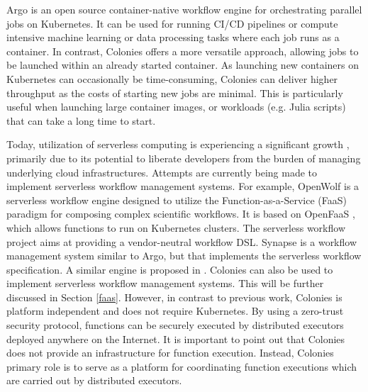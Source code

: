 \documentclass{article}
\begin{document}
Argo \cite{argowf} is an open source container-native workflow engine for orchestrating parallel jobs on Kubernetes. It can be used for running CI/CD pipelines or compute intensive machine learning or data processing tasks where each job runs as a container. In contrast, Colonies offers a more versatile approach, allowing jobs to be launched within an already started container. As launching new containers on Kubernetes can occasionally be time-consuming, Colonies can deliver higher throughput as the costs of starting new jobs are minimal. This is particularly useful when launching large container images, or workloads (e.g. Julia scripts) that can take a long time to start. 

Today, utilization of serverless computing is experiencing a significant growth \cite{cognit}, primarily due to its potential to liberate developers from the burden of managing underlying cloud infrastructures. Attempts are currently being made to implement serverless workflow management systems. For example, OpenWolf \cite{openwolf} is a serverless workflow engine designed to utilize the Function-as-a-Service (FaaS) paradigm for composing complex scientific workflows. It is based on OpenFaaS \cite{openfaas}, which allows functions to run on Kubernetes clusters. 
The serverless workflow project \cite{serverlessworkflows} aims at providing a vendor-neutral workflow DSL. Synapse \cite{synapse} is a workflow management system similar to Argo, but that implements the serverless workflow specification. A similar engine is proposed in \cite{scafe}. 
Colonies can also be used to implement serverless workflow management systems. This will be further discussed in Section \ref{faas}. However, in contrast to previous work, Colonies is platform independent and does not require Kubernetes. By using a zero-trust security protocol, functions can be securely executed by distributed executors deployed anywhere on the Internet. It is important to point out that Colonies does not provide an infrastructure for function execution. Instead, Colonies primary role is to serve as a platform for coordinating function executions which are carried out by distributed executors.
\end{document}
